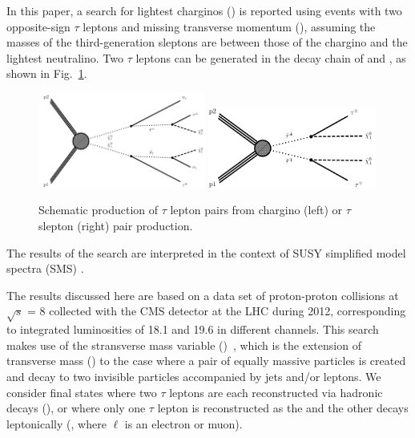 In this paper, a search for lightest charginos (\chione) is reported using events 
with two opposite-sign $\tau$ leptons and 
missing transverse momentum (\MPT), assuming the masses of the third-generation sleptons are between those of the 
chargino and the lightest neutralino. 
Two $\tau$ leptons can be generated in the decay chain of \sTau 
and \chione, as shown in Fig.~\ref{fig:Productions}. 
\begin{figure}[!htb]
\centering
\includegraphics[width=0.49\textwidth]{Introductionfigs/TChipmSlepSnu.pdf}
\includegraphics[width=0.49\textwidth]{Introductionfigs/TSlepSlep.pdf}
\caption{Schematic production of $\tau$ lepton pairs from chargino (left) or $\tau$ slepton (right) pair production.}
\label{fig:Productions}
\end{figure}
The results of the search are interpreted in the context of SUSY simplified model spectra (SMS) \cite{Alwall:2008ag,alves:sms}.

The results discussed here are based on a data set of proton-proton 
collisions at $\sqrt{s}$ = 8\TeV
collected with the CMS detector at the LHC during 2012, corresponding to integrated
luminosities of 18.1 and 19.6 \invfb in different channels. 
This search makes use of the stransverse mass variable (\mttwo)~\cite{Lester:1999tx,Barr:2003rg},
which is the extension of transverse mass (\mt) to the case 
where a pair of equally massive particles is created
and decay to two invisible particles accompanied by jets and/or leptons.  We consider final states where
two $\tau$ leptons are each reconstructed via hadronic decays (\tauTau), or where only one $\tau$ lepton is reconstructed as the \Tau and the other decays leptonically (\leptonTau, where $\ell$ is an electron or muon). 

